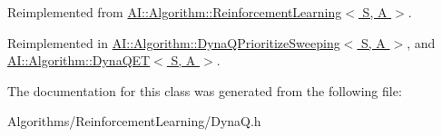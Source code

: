 Reimplemented from \hyperlink{classAI_1_1Algorithm_1_1ReinforcementLearning_a25d7fa245a79e61061436dc0f1db90cb}{A\-I\-::\-Algorithm\-::\-Reinforcement\-Learning$<$ S, A $>$}.



Reimplemented in \hyperlink{classAI_1_1Algorithm_1_1DynaQPrioritizeSweeping_ad08b55f3cf927189dd31abf9fc1c2959}{A\-I\-::\-Algorithm\-::\-Dyna\-Q\-Prioritize\-Sweeping$<$ S, A $>$}, and \hyperlink{classAI_1_1Algorithm_1_1DynaQET_a53b0e06842fbb802acfa5384a84ad448}{A\-I\-::\-Algorithm\-::\-Dyna\-Q\-E\-T$<$ S, A $>$}.



The documentation for this class was generated from the following file\-:\begin{DoxyCompactItemize}
\item 
Algorithms/\-Reinforcement\-Learning/Dyna\-Q.\-h\end{DoxyCompactItemize}
